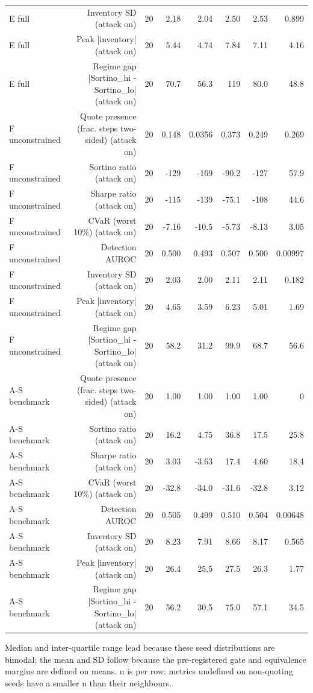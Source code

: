 \begin{table}[htbp]
\begin{tabular}{lrrrrrrr}
    E  full & Inventory SD (attack on) & 20 & 2.18 & 2.04 & 2.50 & 2.53 & 0.899 \\
    E  full & Peak |inventory| (attack on) & 20 & 5.44 & 4.74 & 7.84 & 7.11 & 4.16 \\
    E  full & Regime gap  |Sortino\_hi - Sortino\_lo| (attack on) & 20 & 70.7 & 56.3 & 119 & 80.0 & 48.8 \\
    F  unconstrained & Quote presence (frac. steps two-sided) (attack on) & 20 & 0.148 & 0.0356 & 0.373 & 0.249 & 0.269 \\
    F  unconstrained & Sortino ratio (attack on) & 20 & -129 & -169 & -90.2 & -127 & 57.9 \\
    F  unconstrained & Sharpe ratio (attack on) & 20 & -115 & -139 & -75.1 & -108 & 44.6 \\
    F  unconstrained & CVaR (worst 10\%) (attack on) & 20 & -7.16 & -10.5 & -5.73 & -8.13 & 3.05 \\
    F  unconstrained & Detection AUROC & 20 & 0.500 & 0.493 & 0.507 & 0.500 & 0.00997 \\
    F  unconstrained & Inventory SD (attack on) & 20 & 2.03 & 2.00 & 2.11 & 2.11 & 0.182 \\
    F  unconstrained & Peak |inventory| (attack on) & 20 & 4.65 & 3.59 & 6.23 & 5.01 & 1.69 \\
    F  unconstrained & Regime gap  |Sortino\_hi - Sortino\_lo| (attack on) & 20 & 58.2 & 31.2 & 99.9 & 68.7 & 56.6 \\
    A-S benchmark & Quote presence (frac. steps two-sided) (attack on) & 20 & 1.00 & 1.00 & 1.00 & 1.00 & 0 \\
    A-S benchmark & Sortino ratio (attack on) & 20 & 16.2 & 4.75 & 36.8 & 17.5 & 25.8 \\
    A-S benchmark & Sharpe ratio (attack on) & 20 & 3.03 & -3.63 & 17.4 & 4.60 & 18.4 \\
    A-S benchmark & CVaR (worst 10\%) (attack on) & 20 & -32.8 & -34.0 & -31.6 & -32.8 & 3.12 \\
    A-S benchmark & Detection AUROC & 20 & 0.505 & 0.499 & 0.510 & 0.504 & 0.00648 \\
    A-S benchmark & Inventory SD (attack on) & 20 & 8.23 & 7.91 & 8.66 & 8.17 & 0.565 \\
    A-S benchmark & Peak |inventory| (attack on) & 20 & 26.4 & 25.5 & 27.5 & 26.3 & 1.77 \\
    A-S benchmark & Regime gap  |Sortino\_hi - Sortino\_lo| (attack on) & 20 & 56.2 & 30.5 & 75.0 & 57.1 & 34.5 \\
    \bottomrule
  \end{tabular}
  \begin{minipage}{\linewidth}\vspace{4pt}\footnotesize Median and inter-quartile range lead because these seed distributions are bimodal; the mean and SD follow because the pre-registered gate and equivalence margins are defined on means. n is per row: metrics undefined on non-quoting seeds have a smaller n than their neighbours.\end{minipage}
\end{table}
